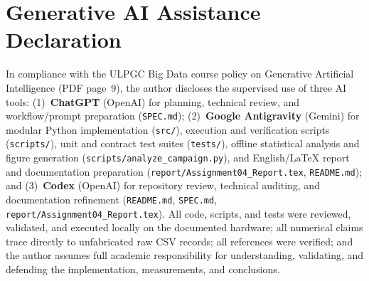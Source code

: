 \documentclass[11pt,a4paper]{article}
\begin{document}
\section{Generative AI Assistance Declaration}
In compliance with the ULPGC Big Data course policy on Generative Artificial Intelligence (PDF page~9), the author discloses the supervised use of three AI tools: (1)~\textbf{ChatGPT} (OpenAI) for planning, technical review, and workflow/prompt preparation (\nolinkurl{SPEC.md}); (2)~\textbf{Google Antigravity} (Gemini) for modular Python implementation (\nolinkurl{src/}), execution and verification scripts (\nolinkurl{scripts/}), unit and contract test suites (\nolinkurl{tests/}), offline statistical analysis and figure generation (\nolinkurl{scripts/analyze_campaign.py}), and English/\LaTeX{} report and documentation preparation (\nolinkurl{report/Assignment04_Report.tex}, \nolinkurl{README.md}); and (3)~\textbf{Codex} (OpenAI) for repository review, technical auditing, and documentation refinement (\nolinkurl{README.md}, \nolinkurl{SPEC.md}, \nolinkurl{report/Assignment04_Report.tex}). All code, scripts, and tests were reviewed, validated, and executed locally on the documented hardware; all numerical claims trace directly to unfabricated raw CSV records; all references were verified; and the author assumes full academic responsibility for understanding, validating, and defending the implementation, measurements, and conclusions.
\end{document}

